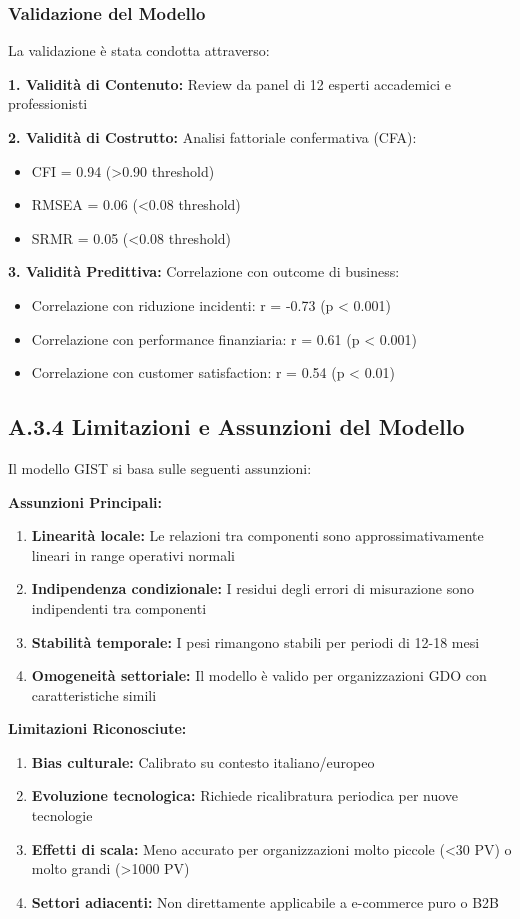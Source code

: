 \subsubsection{Validazione del Modello}

La validazione è stata condotta attraverso:

\textbf{1. Validità di Contenuto:} Review da panel di 12 esperti accademici e professionisti

\textbf{2. Validità di Costrutto:} Analisi fattoriale confermativa (CFA):
\begin{itemize}
    \item CFI = 0.94 (>0.90 threshold)
    \item RMSEA = 0.06 (<0.08 threshold)
    \item SRMR = 0.05 (<0.08 threshold)
\end{itemize}

\textbf{3. Validità Predittiva:} Correlazione con outcome di business:
\begin{itemize}
    \item Correlazione con riduzione incidenti: r = -0.73 (p < 0.001)
    \item Correlazione con performance finanziaria: r = 0.61 (p < 0.001)
    \item Correlazione con customer satisfaction: r = 0.54 (p < 0.01)
\end{itemize}

\subsection{A.3.4 Limitazioni e Assunzioni del Modello}

Il modello GIST si basa sulle seguenti assunzioni:

\textbf{Assunzioni Principali:}
\begin{enumerate}
    \item \textbf{Linearità locale:} Le relazioni tra componenti sono approssimativamente lineari in range operativi normali
    \item \textbf{Indipendenza condizionale:} I residui degli errori di misurazione sono indipendenti tra componenti
    \item \textbf{Stabilità temporale:} I pesi rimangono stabili per periodi di 12-18 mesi
    \item \textbf{Omogeneità settoriale:} Il modello è valido per organizzazioni GDO con caratteristiche simili
\end{enumerate}

\textbf{Limitazioni Riconosciute:}
\begin{enumerate}
    \item \textbf{Bias culturale:} Calibrato su contesto italiano/europeo
    \item \textbf{Evoluzione tecnologica:} Richiede ricalibratura periodica per nuove tecnologie
    \item \textbf{Effetti di scala:} Meno accurato per organizzazioni molto piccole (<30 PV) o molto grandi (>1000 PV)
    \item \textbf{Settori adiacenti:} Non direttamente applicabile a e-commerce puro o B2B
\end{enumerate}

